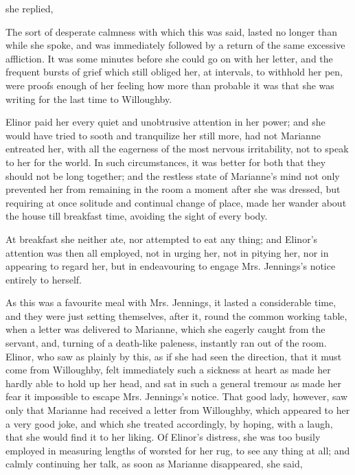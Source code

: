 
 she replied, 

The sort of desperate calmness with which this was said, lasted no longer than while she spoke, and was immediately followed by a return of the same excessive affliction. It was some minutes before she could go on with her letter, and the frequent bursts of grief which still obliged her, at intervals, to withhold her pen, were proofs enough of her feeling how more than probable it was that she was writing for the last time to Willoughby.

Elinor paid her every quiet and unobtrusive attention in her power; and she would have tried to sooth and tranquilize her still more, had not Marianne entreated her, with all the eagerness of the most nervous irritability, not to speak to her for the world. In such circumstances, it was better for both that they should not be long together; and the restless state of Marianne's mind not only prevented her from remaining in the room a moment after she was dressed, but requiring at once solitude and continual change of place, made her wander about the house till breakfast time, avoiding the sight of every body.

At breakfast she neither ate, nor attempted to eat any thing; and Elinor's attention was then all employed, not in urging her, not in pitying her, nor in appearing to regard her, but in endeavouring to engage Mrs. Jennings's notice entirely to herself.

As this was a favourite meal with Mrs. Jennings, it lasted a considerable time, and they were just setting themselves, after it, round the common working table, when a letter was delivered to Marianne, which she eagerly caught from the servant, and, turning of a death-like paleness, instantly ran out of the room. Elinor, who saw as plainly by this, as if she had seen the direction, that it must come from Willoughby, felt immediately such a sickness at heart as made her hardly able to hold up her head, and sat in such a general tremour as made her fear it impossible to escape Mrs. Jennings's notice. That good lady, however, saw only that Marianne had received a letter from Willoughby, which appeared to her a very good joke, and which she treated accordingly, by hoping, with a laugh, that she would find it to her liking. Of Elinor's distress, she was too busily employed in measuring lengths of worsted for her rug, to see any thing at all; and calmly continuing her talk, as soon as Marianne disappeared, she said,


